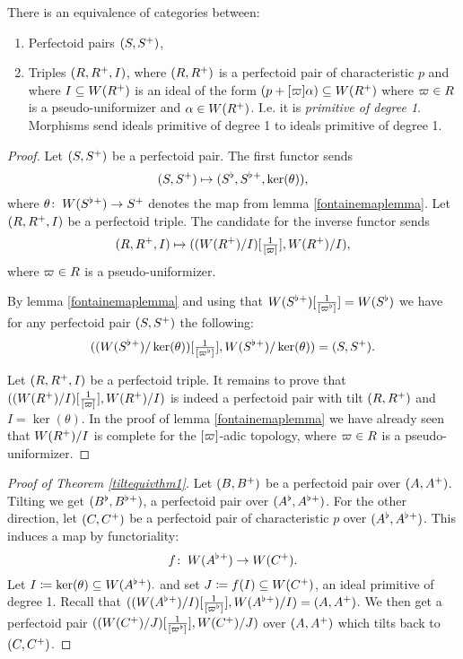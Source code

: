 \begin{cor}
There is an equivalence of categories between:
\begin{enumerate}
\item Perfectoid pairs $(S,S{^{+}})$,
\item Triples $(R,R{^{+}},I)$, where $(R,R{^{+}})$ is a perfectoid pair of characteristic $p$ and where $I\subseteq W(R{^{+}})$  is an ideal of the form
$(p+[\varpi]\alpha)\subseteq W(R{^{+}})$ where $\varpi\in R$ is a pseudo-uniformizer and $\alpha\in W(R{^{+}})$. I.e. it is \emph{primitive of degree 1}. 
Morphisms send ideals primitive of degree 1 to ideals primitive of degree 1.
\end{enumerate}
\end{cor}
\begin{proof}
Let $(S,S{^{+}})$ be a perfectoid pair.
The first functor sends 
\[(S,S{^{+}})\mapsto (S^{\flat}, S^{\flat}{^{+}}, \ker(\theta)),\]
where  $\theta\colon\: W(S^{\flat}{^{+}})\to S{^{+}}$ denotes the map from lemma \ref{fontainemaplemma}.
Let $(R,R{^{+}},I)$ be a perfectoid triple.
The candidate for the inverse functor sends 
\[(R,R{^{+}},I)\mapsto ((W(R{^{+}})/I)[\tfrac{1}{[\varpi]}] ,W(R{^{+}})/I),\] 
where $\varpi\in R$ is a pseudo-uniformizer.

By lemma \ref{fontainemaplemma} and using that
$W(S^{\flat}{^{+}})[\tfrac{1}{[\varpi^{\flat}]}] = W(S^{\flat})$ we have for any perfectoid pair $(S,S{^{+}})$ the following:
\[((W(S^{\flat}{^{+}})/\ker(\theta))[\tfrac{1}{[\varpi^{\flat}]}] ,W(S^{\flat}{^{+}})/\ker(\theta)) = (S,S{^{+}}).\]

Let $(R,R{^{+}},I)$ be a perfectoid triple. It remains to prove that
$((W(R{^{+}})/I)[\tfrac{1}{[\varpi]}] ,W(R{^{+}})/I)$ is indeed a perfectoid pair with tilt $(R,R{^{+}})$ and $I=\ker(\theta)$.
In the proof of lemma \ref{fontainemaplemma} we have already seen that $W(R{^{+}})/I$ is complete for the $[\varpi]$-adic topology, where $\varpi\in R$ is a pseudo-uniformizer.
\end{proof}



\begin{proof}[Proof of Theorem \ref{tiltequivthm1}]
Let $(B,B{^{+}})$ be a perfectoid pair over $(A,A{^{+}})$. Tilting we get  $(B^{\flat},B^{\flat}{^{+}})$, a perfectoid pair over $(A^{\flat},A^{\flat}{^{+}})$.
For the other direction, let $(C,C{^{+}})$ be a perfectoid pair of characteristic $p$ over $(A^{\flat},A^{\flat}{^{+}})$. This induces a map by functoriality:
\[f\colon\: W(A^{\flat}{^{+}})\to W(C{^{+}}).\]
Let $I\coloneqq\ker(\theta)\subseteq W(A^{\flat}{^{+}}).$ and set $J\coloneqq f(I)\subseteq W(C{^{+}})$, an ideal primitive of degree 1.
Recall that 
$((W(A^{\flat}{^{+}})/I)[\tfrac{1}{[\varpi^{\flat}]}] ,W(A^{\flat}{^{+}})/I) = (A,A{^{+}})$.
We then get a perfectoid pair $((W(C{^{+}})/J)[\tfrac{1}{[\varpi^{\flat}]}] ,W(C{^{+}})/J)$ over $(A,A{^{+}})$ which tilts back to $(C,C{^{+}})$.
\end{proof}




